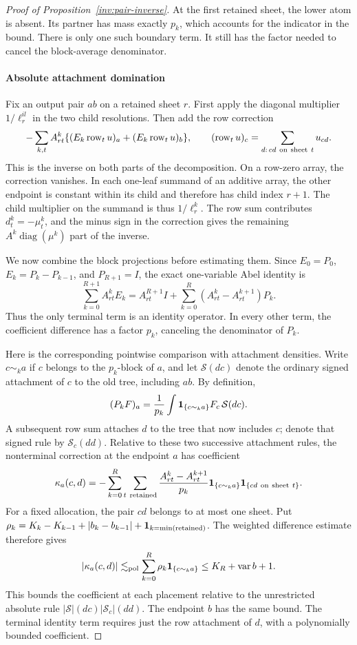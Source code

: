 \begin{proof}[Proof of Proposition~\ref{inv:pair-inverse}]
At the first retained sheet, the lower atom is absent. Its partner has
mass exactly \(p_k\), which accounts for the indicator in the bound.
There is only one such boundary term. It still has the factor needed
to cancel the block-average denominator.

\paragraph{Absolute attachment domination}
Fix an output pair \(ab\) on a retained sheet \(r\). First apply the
diagonal multiplier \(1/\ell_r^{il}\) in the two child resolutions.
Then add the row correction
\[
 -\sum_{k,t}A^k_{rt}\{(E_k\,{\rm row}_t\,u)_a+(E_k\,{\rm row}_t\,u)_b\},
 \qquad ({\rm row}_t\,u)_c=\sum_{d:\,cd\ {\rm on\ sheet}\ t}u_{cd}.
\]
This is the inverse on both parts of the decomposition. On a row-zero
array, the correction vanishes. In each one-leaf summand of an additive
array, the other endpoint is constant within its child and therefore
has child index \(r+1\). The child multiplier on the summand is thus
\(1/\ell_r^k\). The row sum contributes
\(d_t^k=-\mu_t^k\), and the minus sign in the correction gives the
remaining \(A^k\operatorname{diag}(\mu^k)\) part of the inverse.

We now combine the block projections before estimating them. Since
\(E_0=P_0\), \(E_k=P_k-P_{k-1}\), and \(P_{R+1}=I\), the exact
one-variable Abel identity is
\[
 \sum_{k=0}^{R+1}A^k_{rt}E_k
  =A^{R+1}_{rt}I+\sum_{k=0}^{R}(A^k_{rt}-A^{k+1}_{rt})P_k .
\]
Thus the only terminal term is an identity operator. In every other
term, the coefficient difference has a factor \(p_k\), canceling the
denominator of \(P_k\).

Here is the corresponding pointwise comparison with attachment
densities. Write \(c\sim_k a\) if \(c\) belongs to the \(p_k\)-block
of \(a\), and let \(\mathcal S(dc)\) denote the ordinary signed
attachment of \(c\) to the old tree, including \(ab\). By definition,
\[
 (P_kF)_a=\frac1{p_k}\int {\bf1}_{\{c\sim_k a\}}F_c\,\mathcal S(dc).
\]
A subsequent row sum attaches \(d\) to the tree that now includes
\(c\); denote that signed rule by \(\mathcal S_c(dd)\).
Relative to these two successive attachment rules, the nonterminal
correction at the endpoint \(a\) has coefficient
\[
 \kappa_a(c,d)=
 -\sum_{k=0}^{R}\sum_{t\ {\rm retained}}
 \frac{A^k_{rt}-A^{k+1}_{rt}}{p_k}
 {\bf1}_{\{c\sim_k a\}}
 {\bf1}_{\{cd\ {\rm on\ sheet}\ t\}} .
\]
For a fixed allocation, the pair \(cd\) belongs to at most one sheet.
Put
\(\rho_k=K_k-K_{k-1}+|b_k-b_{k-1}|
 +{\bf1}_{k=\min(\mathrm{retained})}\).
The weighted difference estimate therefore gives
\[
 |\kappa_a(c,d)|\lesssim_{\rm pol}
 \sum_{k=0}^{R}\rho_k{\bf1}_{\{c\sim_k a\}}
 \le K_R+\operatorname{var}b+1 .
\]
This bounds the coefficient at each placement relative to the
unrestricted absolute rule
\(|\mathcal S|(dc)|\mathcal S_c|(dd)\).
The endpoint \(b\) has the same bound. The terminal identity term
requires just the row attachment of \(d\), with a polynomially bounded
coefficient.


\end{proof}
